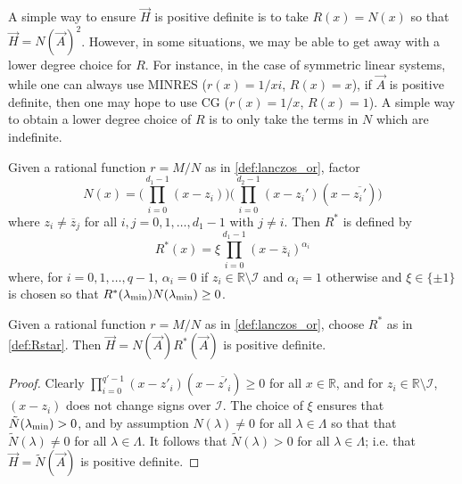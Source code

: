 A simple way to ensure $\vec{H}$ is positive definite is to take \( R(x) = N(x) \) so that $\vec{H} = N(\vec{A})^2$.
However, in some situations, we may be able to get away with a lower degree choice for \( R \).
For instance, in the case of symmetric linear systems, while one can always use MINRES ($r(x)=1/xi$, $R(x)=x$), if \( \vec{A} \) is positive definite, then one may hope to use CG ($r(x)=1/x$, $R(x)=1$).
A simple way to obtain a lower degree choice of \( R \) is to only take the terms in \( N \) which are indefinite.
\begin{definition}
    \label{def:Rstar}
    Given a rational function $r = M/N$ as in \cref{def:lanczos_or}, factor 
    \begin{equation*}
        N(x) = \bigg( {\prod_{i=0}^{d_1-1}} (x-z_i) \bigg) \bigg( {\prod_{i=0}^{d_2-1}} (x-{z_i'})(x-\overline{z_i'}) \bigg)
    \end{equation*}
    where $z_i\neq \overline{z}_j$ for all $i,j = 0,1,\ldots, d_1-1$ with $j \neq i$.
    Then \( R^* \) is defined by
    \begin{equation*}
        R^*(x) = \xi {\prod_{i=0}^{d_1-1}} (x-\overline{z}_i)^{\alpha_i}   
    \end{equation*}    
    where, for \( i=0,1,\ldots,q-1 \), $\alpha_i = 0$ if $z_i\in \mathbb{R} \setminus \mathcal{I}$  and $\alpha_i = 1$ otherwise and $\xi \in \{ \pm 1 \}$ is chosen so that $R^*(\lambda_{\textup{min}})N(\lambda_{\textup{min}}) \geq 0$.  
\end{definition}

\begin{lemma}
    Given a rational function $r = M/N$ as in \cref{def:lanczos_or}, choose \( R^* \) as in \cref{def:Rstar}. 
    Then \( \vec{H} = N(\vec{A}) R^*(\vec{A}) \) is positive definite.
\end{lemma}

\begin{proof}
    Clearly $\prod_{i=0}^{q'-1} (x-{z'}_i)(x-\overline{z'}_i) \geq 0$ for all $x \in \mathbb{R}$, and for $z_i \in \mathbb{R} \setminus \mathcal{I}$, $(x-z_i)$ does not change signs over $\mathcal{I}$. 
The choice of $\xi$ ensures that $\tilde{N}(\lambda_{\textup{min}})>0$, and by assumption $N(\lambda) \neq 0$ for all $\lambda \in \Lambda$ so that that $\tilde{N}(\lambda) \neq 0$ for all $\lambda\in\Lambda$. 
It follows that $\tilde{N}(\lambda) > 0$ for all $\lambda\in\Lambda$; i.e. that $\vec{H} = \tilde{N}(\vec{A})$ is positive definite.
\end{proof}



